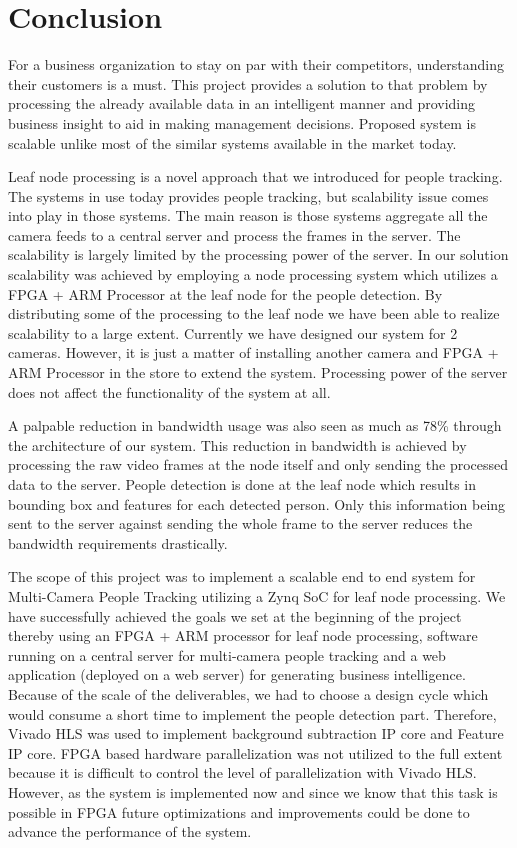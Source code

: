 \documentclass[12pt,a4paper]{report}
\begin{document}
\section{Conclusion}

For a business organization to stay on par with their competitors, understanding their customers is a must. This project provides a solution to that problem by processing the already available data in an intelligent manner and providing business insight to aid in making management decisions. Proposed system is scalable unlike most of the similar systems available in the market today.\\
\par Leaf node processing is a novel approach that we introduced for people tracking. The systems in use today provides people tracking, but scalability issue comes into play in those systems. The main reason is those systems aggregate all the camera feeds to a central server and process the frames in the server. The scalability is largely limited by the processing power of the server. In our solution scalability was achieved by employing a node processing system which utilizes a FPGA + ARM Processor at the leaf node for the people detection. By distributing some of the processing to the leaf node we have been able to realize scalability to a large extent. Currently we have designed our system for 2 cameras. However, it is just a matter of installing another camera and FPGA + ARM Processor in the store to extend the system. Processing power of the server does not affect the functionality of the system at all.\\
\par A palpable reduction in bandwidth usage was also seen as much as 78\% through the architecture of our system. This reduction in bandwidth is achieved by processing the raw video frames at the node itself and only sending the processed data to the server. People detection is done at the leaf node which results in bounding box and features for each detected person.  Only this information being sent to the server against sending the whole frame to the server reduces the bandwidth requirements drastically. \\
\par The scope of this project was to implement a scalable end to end system for Multi-Camera People Tracking utilizing a Zynq SoC for leaf node processing. We have successfully achieved the goals we set at the beginning of the project thereby using an FPGA + ARM processor for leaf node processing, software running on a central server for multi-camera people tracking and a web application (deployed on a web server) for generating business intelligence. Because of the scale of the deliverables, we had to choose a design cycle which would consume a short time to implement the people detection part. Therefore, Vivado HLS was used to implement background subtraction IP core and Feature IP core. FPGA based hardware parallelization was not utilized to the full extent because it is difficult to control the level of parallelization with Vivado HLS. However, as the system is implemented now and since we know that this task is possible in FPGA future optimizations and improvements could be done to advance the performance of the system.\\
\end{document}
